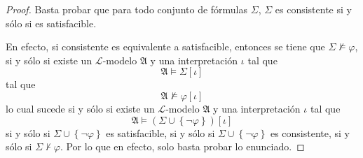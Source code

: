 \documentclass[12pt]{report}
\theoremstyle{largebreak}
\begin{document}
    \begin{proof}
        Basta probar que para todo conjunto de fórmulas $\Sigma$, $\Sigma$ es consistente si y sólo si es satisfacible.

        En efecto, si consistente es equivalente a satisfacible, entonces se tiene que $\Sigma\nvDash\varphi$, si y sólo si existe un $\mathcal{L}$-modelo $\mathfrak{A}$ y una interpretación $\iota$ tal que
        \begin{equation*}
            \mathfrak{A}\vDash\Sigma[\iota]
        \end{equation*}
        tal que
        \begin{equation*}
            \mathfrak{A}\nvDash\varphi[\iota]
        \end{equation*}
        lo cual sucede si y sólo si existe un $\mathcal{L}$-modelo $\mathfrak{A}$ y una interpretación $\iota$ tal que
        \begin{equation*}
            \mathfrak{A}\vDash\left(\Sigma\cup\left\{\neg\varphi \right\}\right)[\iota]
        \end{equation*}
        si y sólo si $\Sigma\cup\left\{\neg\varphi \right\}$ es satisfacible, si y sólo si $\Sigma\cup\left\{\neg\varphi\right\}$ es consistente, si y sólo si $\Sigma\nvdash\varphi$. Por lo que en efecto, solo basta probar lo enunciado.


\end{proof}
\end{document}
